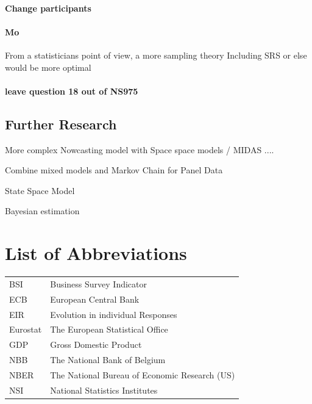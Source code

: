 \documentclass[12pt,a4paper,oneside]{book}
\begin{document}
\subsubsection*{Change participants}

\subsubsection*{Mo}
From a statisticians point of view, a more sampling theory Including SRS or else would be more optimal

\subsubsection{leave question 18 out of NS975}

\section{Further Research}



More complex Nowcasting model with Space space models / MIDAS ....

Combine mixed models and Markov Chain for Panel Data \citep{de_haan-rietdijk_use_2017} 

State Space Model

Bayesian estimation \cite{bialowolski_bayesian_nodate}

\nocite{hlavac_stargazer:_2018}


 

\chapter*{List of Abbreviations}

\begin{tabular}{l l}
  BSI   & Business Survey Indicator \\
  ECB   & European Central Bank \\
  EIR   & Evolution in individual Responses \\
  Eurostat & The European Statistical Office \\
  GDP   & Gross Domestic Product \\
  NBB   & The National Bank of Belgium \\
  NBER  & The National Bureau of Economic Research (US) \\
  NSI   & National Statistics Institutes
\end{tabular}
\end{document}
